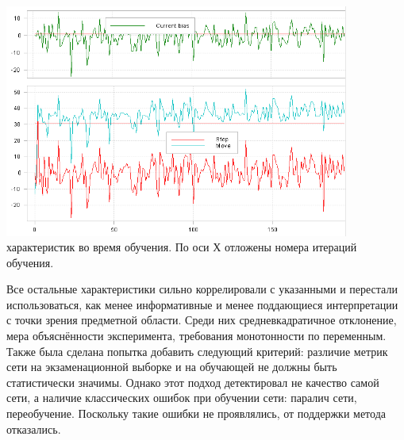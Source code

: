 \documentclass[14pt]{extreport}
\begin{document}
                \begin{center}
                        \includegraphics[width=0.85\textwidth]{Features}
                         характеристик во время обучения. По оси Х отложены номера итераций обучения.
                \end{center}
                    
                Все остальные характеристики сильно коррелировали с указанными и перестали использоваться, как менее информативные и менее поддающиеся интерпретации с точки зрения предметной области. Среди них средневкадратичное отклонение, мера объяснённости эксперимента, требования монотонности по переменным.
                Также была сделана попытка добавить следующий критерий: различие метрик сети на экзаменационной выборке и на обучающей не должны быть статистически значимы. Однако этот подход детектировал не качество самой сети, а наличие классических ошибок при обучении сети: паралич сети, переобучение. Поскольку такие ошибки не проявлялись, от поддержки метода отказались.
                
                
\end{document}
